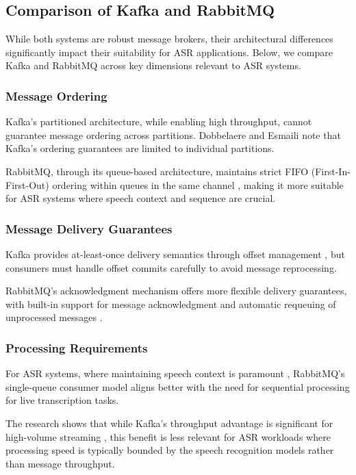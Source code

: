 \subsection{Comparison of Kafka and RabbitMQ}
While both systems are robust message brokers, their architectural differences significantly impact their suitability for ASR applications. Below, we compare Kafka and RabbitMQ across key dimensions relevant to ASR systems.

\subsubsection{Message Ordering}
Kafka's partitioned architecture, while enabling high throughput, cannot guarantee message ordering across partitions. Dobbelaere and Esmaili \cite{kafka_v_rabbitmq} note that Kafka's ordering guarantees are limited to individual partitions.

RabbitMQ, through its queue-based architecture, maintains strict FIFO (First-In-First-Out) ordering within queues in the same channel \cite{kafka_v_rabbitmq}, making it more suitable for ASR systems where speech context and sequence are crucial.

\subsubsection{Message Delivery Guarantees}
Kafka provides at-least-once delivery semantics through offset management \cite{kafka_v_rabbitmq}, but consumers must handle offset commits carefully to avoid message reprocessing.

RabbitMQ's acknowledgment mechanism offers more flexible delivery guarantees, with built-in support for message acknowledgment \cite{kafka_v_rabbitmq} and automatic requeuing of unprocessed messages \cite{rabbitmq_nack}.

\subsubsection{Processing Requirements}
For ASR systems, where maintaining speech context is paramount \cite{speech_context}, RabbitMQ's single-queue consumer model aligns better with the need for sequential processing for live transcription tasks.

The research shows that while Kafka's throughput advantage is significant for high-volume streaming \cite{kafka_v_rabbitmq}, this benefit is less relevant for ASR workloads where processing speed is typically bounded by the speech recognition models rather than message throughput.

